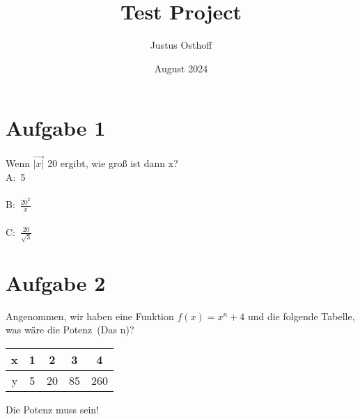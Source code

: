 \documentclass[a4paper]{proc}
\title{Test Project}
\author{Justus Osthoff}
\date{August 2024}
\begin{document}
	\section*{Aufgabe 1}
	Wenn $\vec{|x|}$ 20 ergibt, wie groß ist dann x?\vspace{10pt}\\ %
	A:~5\\
	\\
	B:~\(\frac{20^2}{x}\)\\
	\\
	C:~\(\frac{20}{\sqrt{3}}\) %
	
	\vspace{20pt} %
	
	\section*{Aufgabe 2} %
	Angenommen, wir haben eine Funktion $f(x)=x^n+4$ und die folgende Tabelle, was wäre die Potenz~(Das n)?
	
	\begin{table}[h!]
		\centering
		\begin{tabular}{c||c|c|c|c}
			x & 1 & 2 & 3 & 4\\
			\hline
			y & 5 & 20 & 85 & 260\\
		\end{tabular}
		\label{tab:my_label}
	\end{table}
	Die Potenz muss \underline{\hspace{20pt}} sein!
	
\end{document}

